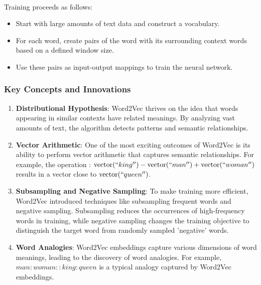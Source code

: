             \paragraph{}Training proceeds as follows:
            
            \begin{itemize}
                \item Start with large amounts of text data and construct a vocabulary.
                \item For each word, create pairs of the word with its surrounding context words based on a defined window size.
                \item Use these pairs as input-output mappings to train the neural network.
            \end{itemize}
        
        \subsubsection{Key Concepts and Innovations}
        
            \begin{enumerate}
                \item \textbf{Distributional Hypothesis}: Word2Vec thrives on the idea that words appearing in similar contexts have related meanings. By analyzing vast amounts of text, the algorithm detects patterns and semantic relationships.
                \item \textbf{Vector Arithmetic}: One of the most exciting outcomes of Word2Vec is its ability to perform vector arithmetic that captures semantic relationships. For example, the operation : $\text{vector}(``king'') - \text{vector}(``man'') + \text{vector}(``woman'')$ results in a vector close to $\text{vector}(``queen'')$.
                \item \textbf{Subsampling and Negative Sampling}: To make training more efficient, Word2Vec introduced techniques like subsampling frequent words and negative sampling. Subsampling reduces the occurrences of high-frequency words in training, while negative sampling changes the training objective to distinguish the target word from randomly sampled 'negative' words.
                \item \textbf{Word Analogies}: Word2Vec embeddings capture various dimensions of word meanings, leading to the discovery of word analogies. For example, $man:woman::king:queen$ is a typical analogy captured by Word2Vec embeddings.
            \end{enumerate}
        

